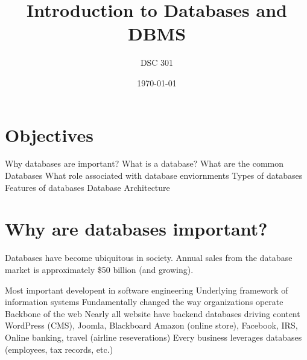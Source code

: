 \documentclass{article}
\newtheorem{definition}{Definition}
\begin{document}
\title{Introduction to Databases and DBMS}
\author{DSC 301}
\date{\today}
\maketitle

 

\begin{outline}[enumerate]

\end{outline}
\begin{outline}
        
\end{outline}












\section*{Objectives}
\begin{outline}
     \1 Why databases are important?
     \1 What is a database?
     \1 What are the common Databases
     \1 What role associated with database enviornments
     \1 Types of databases  
     \1 Features of databases
     \1 Database Architecture  
\end{outline}
















 \section{Why are databases important?}
  
Databases have become ubiquitous in society.  Annual sales from the database market is approximately \$50 billion (and growing).  

\begin{outline}
   \1 Most important developent in software engineering
   \1 Underlying framework of information systems
   \1 Fundamentally changed the way organizations operate
   \1 Backbone of the web
        \2 Nearly all website have backend databases driving content
                \3 WordPress (CMS), Joomla, Blackboard
                \3 Amazon (online store), Facebook, IRS, 
                \3 Online banking, travel (airline reseverations)       
   \1 Every business leverages databases (employees, tax records, etc.)
\end{outline}
\end{document}
